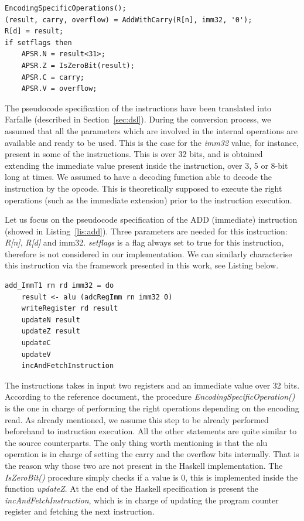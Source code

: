\documentclass[conference]{IEEEtran}
\begin{document}
\begin{lstlisting}[caption=ADD (immediate) instruction - Reference specification,
frame=single, label=lis:add]
EncodingSpecificOperations();
(result, carry, overflow) = AddWithCarry(R[n], imm32, '0');
R[d] = result;
if setflags then
    APSR.N = result<31>;
    APSR.Z = IsZeroBit(result);
    APSR.C = carry;
    APSR.V = overflow;
\end{lstlisting}

The pseudocode specification of the instructions have been translated into Farfalle 
(described in Section~\ref{sec:dsl}). During the conversion process, we
assumed that all the parameters which are involved in the internal operations are available
and ready to be used. This is the case for the \textit{imm32} value, for instance, present in
some of the instructions. This is over 32 bits, and is obtained extending the immediate value
present inside the instruction, over 3, 5 or 8-bit long at times. We assumed to have a
decoding function able to decode the instruction by the opcode. This is theoretically
supposed to execute the right operations (such as the immediate extension) prior to the
instruction execution.

Let us focus on the pseudocode specification of the ADD (immediate) instruction (showed in
Listing~\ref{lis:add}). Three parameters are needed for this instruction: \textit{R[n]},
\textit{R[d]} and imm32. \textit{setflags} is a flag always set to true for this instruction,
therefore is not considered in our implementation. We can similarly characterise this instruction
via the framework presented in this work, see Listing below.\\

\begin{lstlisting}[caption=ADD (immediate) instruction - Farfalle specification,
frame=single, label=lis:addH]
add_ImmT1 rn rd imm32 = do
    result <- alu (adcRegImm rn imm32 0)
    writeRegister rd result
    updateN result
    updateZ result
    updateC
    updateV
    incAndFetchInstruction
\end{lstlisting}

\noindent
The instructions takes in input two registers and an immediate value over 32 bits. According
to the reference document, the procedure \textit{EncodingSpecificOperation()} is the one in
charge of performing the right operations depending on the encoding read. As already
mentioned, we assume this step to be already performed beforehand to instruction execution.
All the other statements are quite similar to the source counterparts.
The only thing worth mentioning is that the alu operation is in charge of
setting the carry and the overflow bits internally. That is the reason why those two are not
present in the Haskell implementation. The \textit{IsZeroBit()} procedure simply checks if a
value is 0, this is implemented inside the function \textit{updateZ}. At the end of the
Haskell specification is present the \textit{incAndFetchInstruction}, which is in charge of
updating the program counter register and fetching the next instruction.
\end{document}
